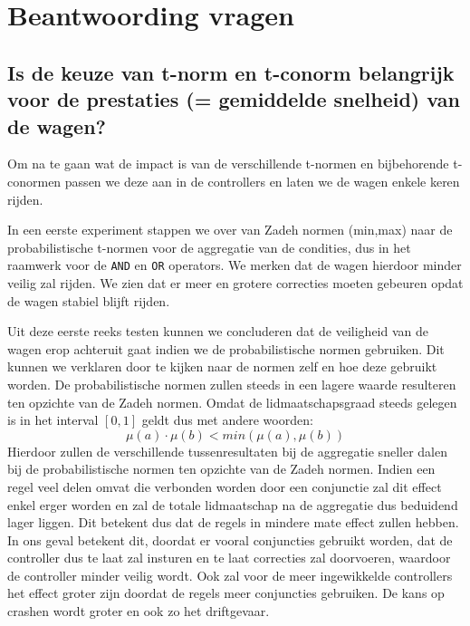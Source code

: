 \section{Beantwoording vragen}

\subsection{Is de keuze van t-norm en t-conorm belangrijk voor de prestaties (= 
gemiddelde snelheid) van de wagen?}

Om na te gaan wat de impact is van de verschillende t-normen en bijbehorende t-conormen passen we deze aan in de controllers en laten we de wagen enkele keren rijden. 

In een eerste experiment stappen we over van Zadeh normen (min,max) naar de probabilistische t-normen voor de aggregatie van de condities, dus in het raamwerk voor de \texttt{AND} en \texttt{OR} operators. We merken dat de wagen hierdoor minder veilig zal rijden. We zien dat er meer en grotere correcties moeten gebeuren opdat de wagen stabiel blijft rijden. 

Uit deze eerste reeks testen kunnen we concluderen dat de veiligheid van de wagen erop achteruit gaat indien we de probabilistische normen gebruiken. Dit kunnen we verklaren door te kijken naar de normen zelf en hoe deze gebruikt worden. De probabilistische normen zullen steeds in een lagere waarde resulteren ten opzichte van de Zadeh normen. Omdat de lidmaatschapsgraad steeds gelegen is in het interval $[0,1]$ geldt dus met andere woorden:
\begin{equation}
\mu (a) \cdot \mu (b) < min(\mu (a),\mu (b))
\end{equation}
Hierdoor zullen de verschillende tussenresultaten bij de aggregatie sneller dalen bij de probabilistische normen ten opzichte van de Zadeh normen. Indien een regel veel delen omvat die verbonden worden door een conjunctie zal dit effect enkel erger worden en zal de totale lidmaatschap na de aggregatie dus beduidend lager liggen. Dit betekent dus dat de regels in mindere mate effect zullen hebben. In ons geval betekent dit, doordat er vooral conjuncties gebruikt worden, dat de controller dus te laat zal insturen en te laat correcties zal doorvoeren, waardoor de controller minder veilig wordt. Ook zal voor de meer ingewikkelde controllers het effect groter zijn doordat de regels meer conjuncties gebruiken. De kans op crashen wordt groter en ook zo het driftgevaar.

